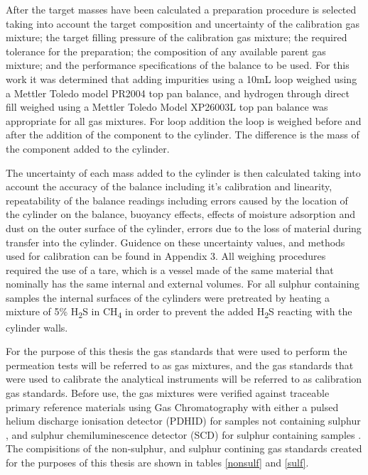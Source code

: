After the target masses have been calculated a preparation procedure is selected taking into account the target composition and uncertainty of the calibration gas mixture; the target filling pressure of the calibration gas mixture; the required tolerance for the preparation; the composition of any available parent gas mixture; and the performance specifications of the balance to be used.  For this work it was determined that adding impurities using a 10mL loop weighed using a Mettler Toledo model  PR2004 top pan balance, and hydrogen through direct fill weighed using a Mettler Toledo Model XP26003L top pan balance was appropriate for all gas mixtures. For loop addition the loop is weighed before and after the addition of the component to the cylinder. The difference is the mass of the component added to the cylinder. 

The uncertainty of each mass added to the cylinder is then calculated taking into account the accuracy of the balance including it's calibration and linearity, repeatability of the balance readings including errors caused by the location of the cylinder on the balance, buoyancy effects, effects of moisture adsorption and dust on the outer surface of the cylinder, errors due to the loss of material during transfer into the cylinder. Guidence on these uncertainty values, and methods used for calibration can be found in Appendix 3. All weighing procedures required the use of a tare, which is a vessel made of the same material that nominally has the same internal and external volumes. For all sulphur containing samples the internal surfaces of the cylinders were pretreated by heating a mixture of 5\% H\textsubscript{2}S in CH\textsubscript{4} in order to prevent the added H\textsubscript{2}S reacting with the cylinder walls. 

For the purpose of this thesis the gas standards that were used to perform the permeation tests will be referred to as gas mixtures, and the gas standards that were used to calibrate the analytical instruments will be referred to as calibration gas standards. Before use, the gas mixtures were verified against traceable primary reference materials using Gas Chromatography with either a pulsed helium discharge ionisation detector (PDHID) for samples not containing sulphur \cite{bacquart_murugan_2019, morris_bacquart_2019}, and sulphur chemiluminescence detector (SCD) for sulphur containing samples \cite{bacquart_murugan_20191}. The compisitions of the non-sulphur, and sulphur contining gas standards created for the purposes of this thesis are shown in tables \ref{nonsulf} and \ref{sulf}.

